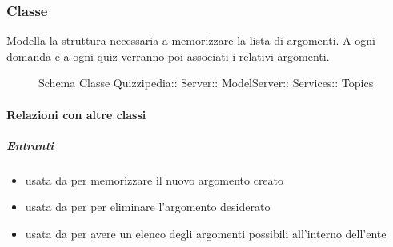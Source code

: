 \subsubsection{Classe }
Modella la struttura necessaria a memorizzare la lista di argomenti. A ogni domanda e a ogni quiz verranno poi associati i relativi argomenti.
\begin{figure}[H]
\centering
\noindent{}
\caption[Schema Classe Topics]{Schema Classe Quizzipedia:: Server:: ModelServer:: Services:: Topics}
\end{figure}
\paragraph{Relazioni con altre classi}
\subparagraph{Entranti}
\begin{itemize}
\item usata da  per memorizzare il nuovo argomento creato
\item usata da  per per eliminare l'argomento desiderato
\item usata da  per avere un elenco degli argomenti possibili all'interno dell'ente
\end{itemize}
